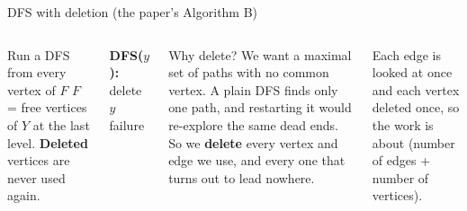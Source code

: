 \documentclass[aspectratio=169,11pt]{beamer}
\newenvironment{plain}[1][In plain words]{\begin{exampleblock}{#1}}{\end{exampleblock}}
\begin{document}
\begin{frame}{DFS with deletion (the paper's Algorithm B)}
\begin{columns}[T]
\begin{block}{Run a DFS from every vertex of $F$}
\footnotesize
$F$ = free vertices of $Y$ at the last level. \textbf{Deleted} vertices are never used again.
\end{block}
\begin{algorithm}[H]
\footnotesize
\SetAlgoLined
\SetAlgoNoEnd
\SetInd{0.6em}{0.8em}
\textbf{DFS($y$):}\;
delete $y$\;
\KwRet failure\;
\end{algorithm}
\small
\begin{plain}[Why delete?]
We want a maximal set of paths with no common vertex. A plain DFS finds only one path, and restarting it would re-explore the same dead ends. So we \textbf{delete} every vertex and edge we use, and every one that turns out to lead nowhere.
\end{plain}
\vspace{1mm}
{\small Each edge is looked at once and each vertex deleted once, so the work is about (number of edges + number of vertices).}
\end{columns}
\end{frame}
\end{document}
